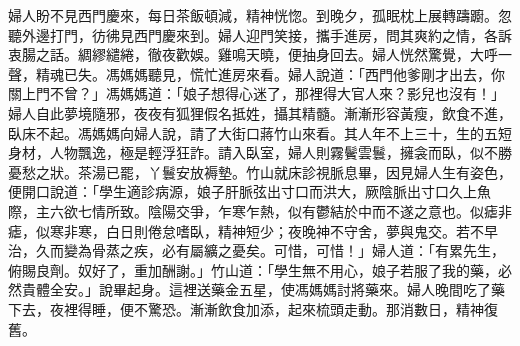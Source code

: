 婦人盼不見西門慶來，每日茶飯頓減，精神恍惚。到晚夕，孤眠枕上展轉躊躕。忽聽外邊打門，彷彿見西門慶來到。婦人迎門笑接，攜手進房，問其爽約之情，各訴衷腸之話。綢繆繾綣，徹夜歡娛。雞鳴天曉，便抽身回去。婦人恍然驚覺，大呼一聲，精魂已失。馮媽媽聽見，慌忙進房來看。婦人說道：「西門他爹剛才出去，你關上門不曾？」馮媽媽道：「娘子想得心迷了，那裡得大官人來？影兒也沒有！」婦人自此夢境隨邪，夜夜有狐狸假名抵姓，攝其精髓。漸漸形容黃瘦，飲食不進，臥床不起。馮媽媽向婦人說，請了大街口蔣竹山來看。其人年不上三十，生的五短身材，人物飄逸，極是輕浮狂詐。請入臥室，婦人則霧鬢雲鬟，擁衾而臥，似不勝憂愁之狀。茶湯已罷，丫鬟安放褥墊。竹山就床診視脈息畢，因見婦人生有姿色，便開口說道：「學生適診病源，娘子肝脈弦出寸口而洪大，厥陰脈出寸口久上魚際，主六欲七情所致。陰陽交爭，乍寒乍熱，似有鬱結於中而不遂之意也。似瘧非瘧，似寒非寒，白日則倦怠嗜臥，精神短少；夜晚神不守舍，夢與鬼交。若不早治，久而變為骨蒸之疾，必有屬纊之憂矣。可惜，可惜！」婦人道：「有累先生，俯賜良劑。奴好了，重加酬謝。」竹山道：「學生無不用心，娘子若服了我的藥，必然貴體全安。」說畢起身。這裡送藥金五星，使馮媽媽討將藥來。婦人晚間吃了藥下去，夜裡得睡，便不驚恐。漸漸飲食加添，起來梳頭走動。那消數日，精神復舊。


